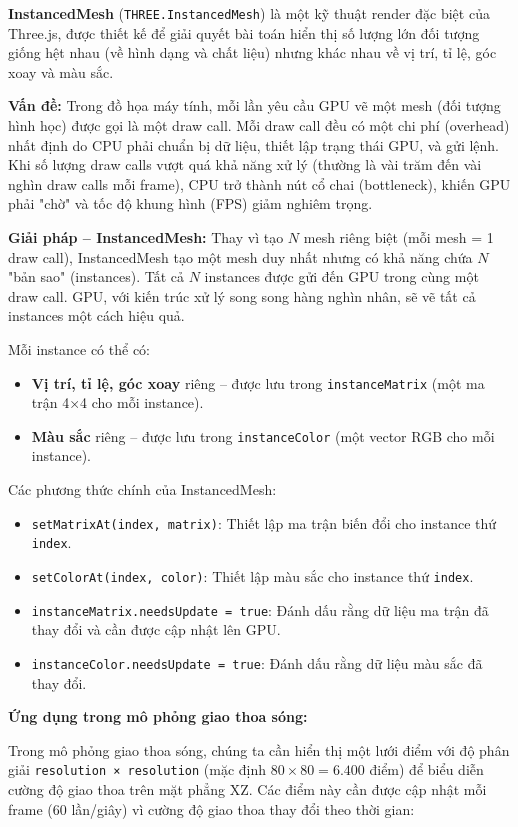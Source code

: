 \textbf{InstancedMesh} (\texttt{THREE.InstancedMesh}) là một kỹ thuật render đặc biệt của Three.js, được thiết kế để giải quyết bài toán hiển thị số lượng lớn đối tượng giống hệt nhau (về hình dạng và chất liệu) nhưng khác nhau về vị trí, tỉ lệ, góc xoay và màu sắc.

\textbf{Vấn đề:} Trong đồ họa máy tính, mỗi lần yêu cầu GPU vẽ một mesh (đối tượng hình học) được gọi là một draw call. Mỗi draw call đều có một chi phí (overhead) nhất định do CPU phải chuẩn bị dữ liệu, thiết lập trạng thái GPU, và gửi lệnh. Khi số lượng draw calls vượt quá khả năng xử lý (thường là vài trăm đến vài nghìn draw calls mỗi frame), CPU trở thành nút cổ chai (bottleneck), khiến GPU phải "chờ" và tốc độ khung hình (FPS) giảm nghiêm trọng.

\textbf{Giải pháp – InstancedMesh:} Thay vì tạo $N$ mesh riêng biệt (mỗi mesh = 1 draw call), InstancedMesh tạo một mesh duy nhất nhưng có khả năng chứa $N$ "bản sao" (instances). Tất cả $N$ instances được gửi đến GPU trong cùng một draw call. GPU, với kiến trúc xử lý song song hàng nghìn nhân, sẽ vẽ tất cả instances một cách hiệu quả.

Mỗi instance có thể có:
\begin{itemize}
    \item \textbf{Vị trí, tỉ lệ, góc xoay} riêng – được lưu trong \texttt{instanceMatrix} (một ma trận 4×4 cho mỗi instance).
    \item \textbf{Màu sắc} riêng – được lưu trong \texttt{instanceColor} (một vector RGB cho mỗi instance).
\end{itemize}

Các phương thức chính của InstancedMesh:
\begin{itemize}
    \item \texttt{setMatrixAt(index, matrix)}: Thiết lập ma trận biến đổi cho instance thứ \texttt{index}.
    \item \texttt{setColorAt(index, color)}: Thiết lập màu sắc cho instance thứ \texttt{index}.
    \item \texttt{instanceMatrix.needsUpdate = true}: Đánh dấu rằng dữ liệu ma trận đã thay đổi và cần được cập nhật lên GPU.
    \item \texttt{instanceColor.needsUpdate = true}: Đánh dấu rằng dữ liệu màu sắc đã thay đổi.
\end{itemize}

\textbf{Ứng dụng trong mô phỏng giao thoa sóng:}

Trong mô phỏng giao thoa sóng, chúng ta cần hiển thị một lưới điểm với độ phân giải \texttt{resolution × resolution} (mặc định $80 \times 80 = 6.400$ điểm) để biểu diễn cường độ giao thoa trên mặt phẳng XZ. Các điểm này cần được cập nhật mỗi frame (60 lần/giây) vì cường độ giao thoa thay đổi theo thời gian:

